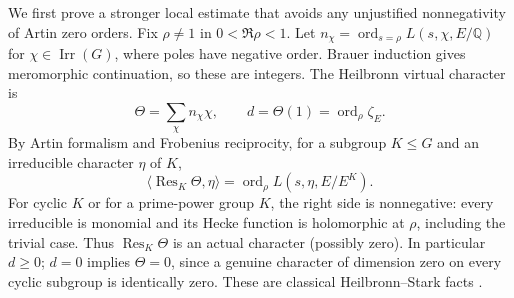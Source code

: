 \documentclass[11pt]{article}
\theoremstyle{remark}\newtheorem{remark}[theorem]{Remark}
\newcommand{\Q}{\mathbb Q}
\newcommand{\ord}{\operatorname{ord}}
\newcommand{\Res}{\operatorname{Res}}
\begin{document}
We first prove a stronger local estimate that avoids any unjustified nonnegativity of Artin zero orders. Fix $\rho\ne1$ in $0<\Re\rho<1$. Let $n_\chi=\ord_{s=\rho} L(s,\chi,E/\Q)$ for $\chi\in\operatorname{Irr}(G)$, where poles have negative order. Brauer induction gives meromorphic continuation, so these are integers. The Heilbronn virtual character is
\[ \Theta=\sum_\chi n_\chi\chi,\qquad d=\Theta(1)=\ord_\rho\zeta_E.\]
By Artin formalism and Frobenius reciprocity, for a subgroup $K\le G$ and an irreducible character $\eta$ of $K$,
\begin{equation}\label{eq:heil}
 \langle\Res_K\Theta,\eta\rangle=\ord_\rho L(s,\eta,E/E^K).
\end{equation}
For cyclic $K$ or for a prime-power group $K$, the right side is nonnegative: every irreducible is monomial and its Hecke function is holomorphic at $\rho$, including the trivial case. Thus $\Res_K\Theta$ is an actual character (possibly zero). In particular $d\ge0$; $d=0$ implies $\Theta=0$, since a genuine character of dimension zero on every cyclic subgroup is identically zero. These are classical Heilbronn--Stark facts \cite{heilbronn}.
\end{document}
